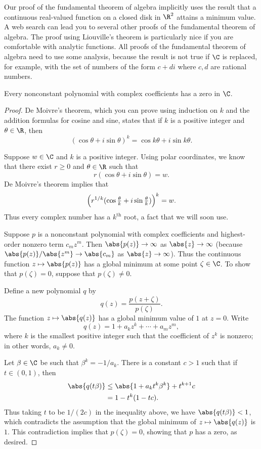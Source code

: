 Our proof of the fundamental theorem of algebra implicitly uses the result that
a continuous real-valued function on a closed disk in $\R^2$ attains a minimum
value. A web search can lead you to several other proofs of the fundamental
theorem of algebra. The proof using Liouville's theorem is particularly nice if
you are comfortable with analytic functions. All proofs of the fundamental
theorem of algebra need to use some analysis, because the result is not true if
$\C$ is replaced, for example, with the set of numbers of the form $c+di$ where
$c,d$ are rational numbers.

\begin{result}\label{ax:4.12}
Every nonconstant polynomial with complex coefficients has a zero in $\C$.
\end{result}

\begin{proof}
De Moivre's theorem, which you can prove using induction on $k$ and the
addition formulas for cosine and sine, states that if $k$ is a positive integer
and $\theta\in\R$, then
\[ (\cos\theta+i\sin\theta)^k = \cos k\theta+i\sin k\theta. \]

Suppose $w\in\C$ and $k$ is a positive integer. Using polar coordinates, we
know that there exist $r\ge0$ and $\theta\in\R$ such that
\[ r(\cos\theta+i\sin\theta) = w. \]
De Moivre's theorem implies that
\[ \Bigl(r^{1/k}(\cos\tfrac{\theta}{k}+i\sin\tfrac{\theta}{k})
   \Bigr)^{k} = w. \]
Thus every complex number has a $k^{\text{th}}$ root, a fact that we will soon
use.

Suppose $p$ is a nonconstant polynomial with complex coefficients and
highest-order nonzero term $c_mz^m$. Then $\abs{p(z)}\to\infty$ as
$\abs{z}\to\infty$ (because $\abs{p(z)}/\abs{z^m}\to\abs{c_m}$ as
$\abs{z}\to\infty$). Thus the continuous function $z\mapsto\abs{p(z)}$ has a
global minimum at some point $\zeta\in\C$. To show that $p(\zeta)=0$, suppose
that $p(\zeta)\ne0$.

Define a new polynomial $q$ by
\[ q(z) = \frac{p(z+\zeta)}{p(\zeta)}. \]
The function $z\mapsto\abs{q(z)}$ has a global minimum value of $1$ at $z=0$.
Write
\[ q(z) = 1+a_kz^k+\cdots+a_mz^m, \]
where $k$ is the smallest positive integer such that the coefficient of $z^k$
is nonzero; in other words, $a_k\ne0$.

Let $\beta\in\C$ be such that $\beta^k=-1/a_k$. There is a constant
$c>1$ such that if $t\in(0,1)$, then
\begin{align*}
\abs{q(t\beta)} &\le \abs{1+a_kt^k\beta^k}+t^{k+1}c\\
  &= 1-t^k(1-tc).
\end{align*}
Thus taking $t$ to be $1/(2c)$ in the inequality above, we have
$\abs{q(t\beta)}<1$, which contradicts the assumption that the global minimum
of $z\mapsto\abs{q(z)}$ is $1$. This contradiction implies that $p(\zeta)=0$,
showing that $p$ has a zero, as desired.
\end{proof}


